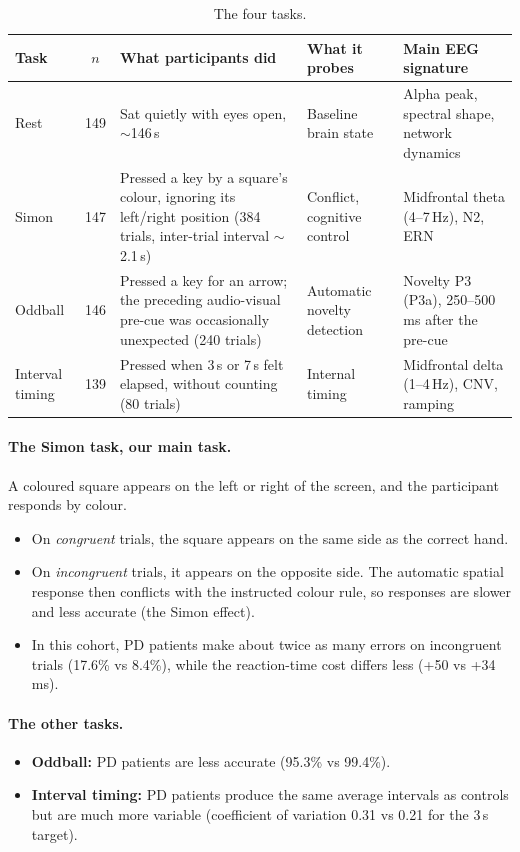 \documentclass[11pt,a4paper]{article}
\begin{document}
\begin{table}[h]
\centering
\small
\begin{tabularx}{\textwidth}{l c L L L}
\toprule
Task & $n$ & What participants did & What it probes & Main EEG signature \\
\midrule
Rest & 149 & Sat quietly with eyes open, $\sim$146\,s & Baseline brain state & Alpha peak, spectral shape, network dynamics \\
Simon & 147 & Pressed a key by a square's colour, ignoring its left/right position (384 trials, inter-trial interval $\sim$2.1\,s) & Conflict, cognitive control & Midfrontal theta (4--7\,Hz), N2, ERN \\
Oddball & 146 & Pressed a key for an arrow; the preceding audio-visual pre-cue was occasionally unexpected (240 trials) & Automatic novelty detection & Novelty P3 (P3a), 250--500\,ms after the pre-cue \\
Interval timing & 139 & Pressed when 3\,s or 7\,s felt elapsed, without counting (80 trials) & Internal timing & Midfrontal delta (1--4\,Hz), CNV, ramping \\
\bottomrule
\end{tabularx}
\caption{The four tasks.}
\end{table}

\paragraph{The Simon task, our main task.} A coloured square appears on the left or right of the screen, and the participant responds by colour.
\begin{itemize}
  \item On \emph{congruent} trials, the square appears on the same side as the correct hand.
  \item On \emph{incongruent} trials, it appears on the opposite side. The automatic spatial response then conflicts with the instructed colour rule, so responses are slower and less accurate (the Simon effect).
  \item In this cohort, PD patients make about twice as many errors on incongruent trials (17.6\% vs 8.4\%), while the reaction-time cost differs less (+50 vs +34\,ms).
\end{itemize}

\paragraph{The other tasks.}
\begin{itemize}
  \item \textbf{Oddball:} PD patients are less accurate (95.3\% vs 99.4\%).
  \item \textbf{Interval timing:} PD patients produce the same average intervals as controls but are much more variable (coefficient of variation 0.31 vs 0.21 for the 3\,s target).
\end{itemize}
\end{document}
